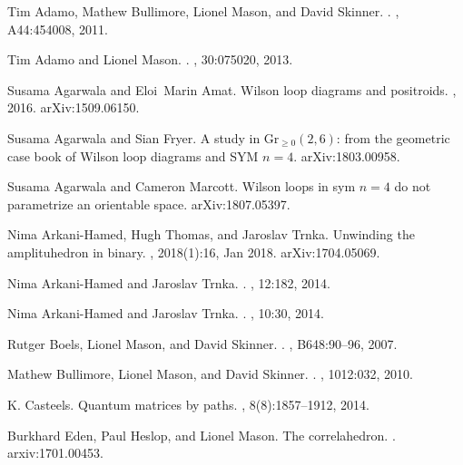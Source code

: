 \documentclass[11pt]{article}
\theoremstyle{remark}
\theoremstyle{definition}
\begin{document}
\begin{thebibliography}{10}
Tim Adamo, Mathew Bullimore, Lionel Mason, and David Skinner.
.
, A44:454008, 2011.

Tim Adamo and Lionel Mason.
.
, 30:075020, 2013.

Susama Agarwala and Eloi~Marin Amat.
\newblock Wilson loop diagrams and positroids.
, 2016.
\newblock arXiv:1509.06150.

Susama Agarwala and Sian Fryer.
\newblock A study in $\textrm{Gr}_{\geq 0}(2,6)$: from the geometric case book
  of {W}ilson loop diagrams and {SYM} $n=4$.
\newblock arXiv:1803.00958.

Susama Agarwala and Cameron Marcott.
\newblock Wilson loops in sym $n=4$ do not parametrize an orientable space.
\newblock arXiv:1807.05397.

Nima Arkani-Hamed, Hugh Thomas, and Jaroslav Trnka.
\newblock Unwinding the amplituhedron in binary.
, 2018(1):16, Jan 2018.
\newblock arXiv:1704.05069.

Nima Arkani-Hamed and Jaroslav Trnka.
.
, 12:182, 2014.

Nima Arkani-Hamed and Jaroslav Trnka.
.
, 10:30, 2014.

Rutger Boels, Lionel Mason, and David Skinner.
.
, B648:90--96, 2007.

Mathew Bullimore, Lionel Mason, and David Skinner.
.
, 1012:032, 2010.

K. Casteels.
\newblock Quantum matrices by paths.
, 8(8):1857--1912, 2014.

Burkhard Eden, Paul Heslop, and Lionel Mason.
\newblock The correlahedron.
.
\newblock arxiv:1701.00453.


\end{thebibliography}
\end{document}
